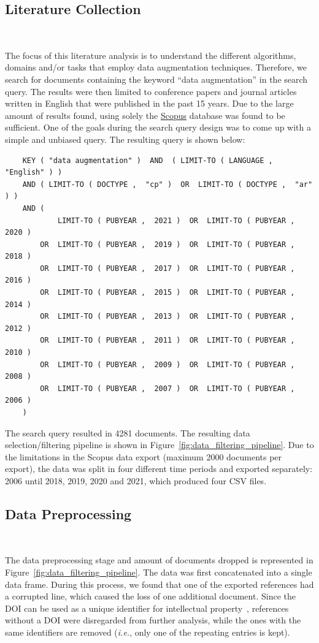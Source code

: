 \documentclass[parskip=full]{scrartcl}
\begin{document}
\subsection{Literature Collection}~\label{sec:lit_collection}

The focus of this literature analysis is to understand the different
algorithms, domains and/or tasks that employ data augmentation techniques.
Therefore, we search for documents containing the keyword ``data
augmentation'' in the search query. The results were then limited to
conference papers and journal articles written in English that were published
in the past 15 years.  Due to the large amount of results found, using solely
the \href{https://www.scopus.com/}{Scopus} database was found to be
sufficient. One of the goals during the search query design was to come up
with a simple and unbiased query. The resulting query is shown below:

\begin{verbatim}
    KEY ( "data augmentation" )  AND  ( LIMIT-TO ( LANGUAGE ,  "English" ) )  
    AND ( LIMIT-TO ( DOCTYPE ,  "cp" )  OR  LIMIT-TO ( DOCTYPE ,  "ar" ) )  
    AND (
            LIMIT-TO ( PUBYEAR ,  2021 )  OR  LIMIT-TO ( PUBYEAR ,  2020 )  
        OR  LIMIT-TO ( PUBYEAR ,  2019 )  OR  LIMIT-TO ( PUBYEAR ,  2018 )  
        OR  LIMIT-TO ( PUBYEAR ,  2017 )  OR  LIMIT-TO ( PUBYEAR ,  2016 )  
        OR  LIMIT-TO ( PUBYEAR ,  2015 )  OR  LIMIT-TO ( PUBYEAR ,  2014 )  
        OR  LIMIT-TO ( PUBYEAR ,  2013 )  OR  LIMIT-TO ( PUBYEAR ,  2012 )  
        OR  LIMIT-TO ( PUBYEAR ,  2011 )  OR  LIMIT-TO ( PUBYEAR ,  2010 )  
        OR  LIMIT-TO ( PUBYEAR ,  2009 )  OR  LIMIT-TO ( PUBYEAR ,  2008 )  
        OR  LIMIT-TO ( PUBYEAR ,  2007 )  OR  LIMIT-TO ( PUBYEAR ,  2006 ) 
    )  
\end{verbatim}

The search query resulted in 4281 documents. The resulting data
selection/filtering pipeline is shown in
Figure~\ref{fig:data_filtering_pipeline}. Due to the limitations in the Scopus
data export (maximum 2000 documents per export), the data was split in four
different time periods and exported separately: 2006 until 2018, 2019, 2020
and 2021, which produced four CSV files.

\subsection{Data Preprocessing}~\label{sec:data_preprocessing}

The data preprocessing stage and amount of documents dropped is represented in
Figure~\ref{fig:data_filtering_pipeline}. The data was first concatenated into
a single data frame. During this process, we found that one of the exported
references had a corrupted line, which caused the loss of one additional
document.  Since the DOI can be used as a unique identifier for intellectual
property~\cite{Paskin1999}, references without a DOI were disregarded from
further analysis, while the ones with the same identifiers are removed
(\textit{i.e.}, only one of the repeating entries is kept).
\end{document}
